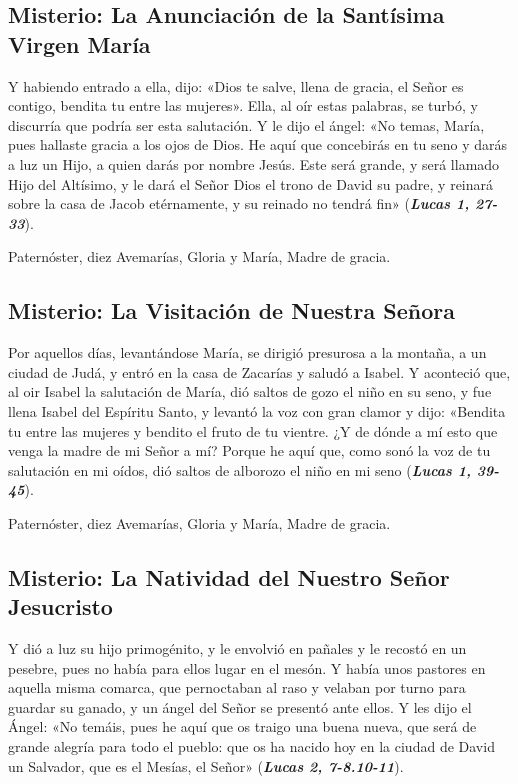 \documentclass[./main.tex]{subfiles}
\newcounter{joyful-counter}
\begin{document}
\subsection*{ Misterio: La Anunciación de la Santísima Virgen María}
Y habiendo entrado a ella, dijo: «Dios te salve, llena de gracia, el Señor es contigo, bendita tu entre las mujeres».
Ella, al oír estas palabras, se turbó, y discurría que podría ser esta salutación. Y le dijo el ángel: «No temas, María,
pues hallaste gracia a los ojos de Dios. He aquí que concebirás en tu seno y darás a luz un Hijo, a quien darás por
nombre Jesús. Este será grande, y será llamado Hijo del Altísimo, y le dará el Señor Dios el trono de David su padre,
y reinará sobre la casa de Jacob etérnamente, y su reinado no tendrá fin» (\textbf{\emph{Lucas 1, 27-33}}).

\begin{center}
      Paternóster, diez Avemarías, Gloria y María, Madre de gracia.
\end{center}

\subsection*{ Misterio: La Visitación de Nuestra Señora}

Por aquellos días, levantándose María, se dirigió presurosa a la montaña, a un ciudad de Judá, y entró en la casa de Zacarías y saludó a Isabel.
Y aconteció que, al oir Isabel la salutación de María, dió saltos de gozo el niño en su seno, y fue llena Isabel del Espíritu Santo,
y levantó la voz con gran clamor y dijo: «Bendita tu entre las mujeres y bendito el fruto de tu vientre. ¿Y de dónde a mí esto que venga la madre de mi Señor a mí?
Porque he aquí que, como sonó la voz de tu salutación en mi oídos, dió saltos de alborozo el niño en mi seno (\textbf{\emph{Lucas 1, 39-45}}).

\begin{center}
      Paternóster, diez Avemarías, Gloria y María, Madre de gracia.
\end{center}

\subsection*{ Misterio: La Natividad del Nuestro Señor Jesucristo}

Y dió a luz su hijo primogénito, y le envolvió en pañales y le recostó en un pesebre, pues no había para ellos lugar en el mesón.
Y había unos pastores en aquella misma comarca, que pernoctaban al raso y velaban por turno para guardar su ganado,
y un ángel del Señor se presentó ante ellos. Y les dijo el Ángel: «No temáis, pues he aquí que os traigo una buena nueva,
que será de grande alegría para todo el pueblo: que os ha nacido hoy en la ciudad de David un Salvador, que es el Mesías, el Señor» (\textbf{\emph{Lucas 2, 7-8.10-11}}).
\end{document}
